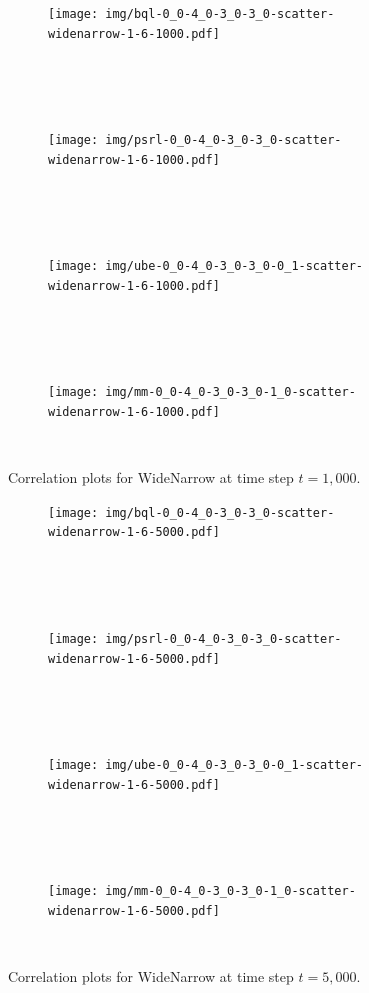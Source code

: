 \documentclass{article}
\begin{document}
\begin{appendices}
\clearpage

\begin{figure}[h!]
\centering
\begin{subfigure}{1.0\textwidth}
\texttt{[image: img/bql-0\_0-4\_0-3\_0-3\_0-scatter-widenarrow-1-6-1000.pdf]}
\end{subfigure}\\
~\\
~\\
\begin{subfigure}{1.0\textwidth}
\texttt{[image: img/psrl-0\_0-4\_0-3\_0-3\_0-scatter-widenarrow-1-6-1000.pdf]}
\end{subfigure}\\
~\\
~\\
\begin{subfigure}{1.0\textwidth}
\texttt{[image: img/ube-0\_0-4\_0-3\_0-3\_0-0\_1-scatter-widenarrow-1-6-1000.pdf]}
\end{subfigure}\\
~\\
~\\
\begin{subfigure}{1.0\textwidth}
\texttt{[image: img/mm-0\_0-4\_0-3\_0-3\_0-1\_0-scatter-widenarrow-1-6-1000.pdf]}
\end{subfigure}\\
\captionsetup{width=0.9\linewidth}
\caption{Correlation plots for WideNarrow at time step $t = 1,000$.}\label{correlations_widenarrow_500}
\end{figure}

\begin{figure}[h!]
\centering
\begin{subfigure}{1.0\textwidth}
\texttt{[image: img/bql-0\_0-4\_0-3\_0-3\_0-scatter-widenarrow-1-6-5000.pdf]}
\end{subfigure}\\
~\\
~\\
\begin{subfigure}{1.0\textwidth}
\texttt{[image: img/psrl-0\_0-4\_0-3\_0-3\_0-scatter-widenarrow-1-6-5000.pdf]}
\end{subfigure}\\
~\\
~\\
\begin{subfigure}{1.0\textwidth}
\texttt{[image: img/ube-0\_0-4\_0-3\_0-3\_0-0\_1-scatter-widenarrow-1-6-5000.pdf]}
\end{subfigure}\\
~\\
~\\
\begin{subfigure}{1.0\textwidth}
\texttt{[image: img/mm-0\_0-4\_0-3\_0-3\_0-1\_0-scatter-widenarrow-1-6-5000.pdf]}
\end{subfigure}\\
\captionsetup{width=0.9\linewidth}
\caption{Correlation plots for WideNarrow at time step $t = 5,000$.}\label{correlations_widenarrow_2500}
\end{figure}


\end{appendices}
\end{document}
